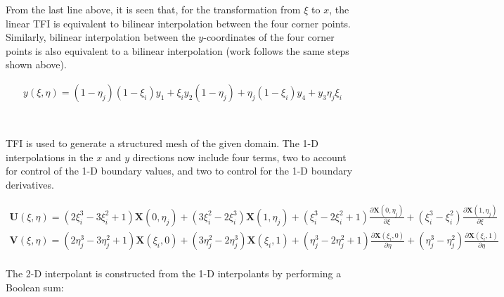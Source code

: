 \documentclass[10pt]{article}
\begin{document}
From the last line above, it is seen that, for the transformation from \(\xi\) to \(x\), the linear TFI is equivalent to bilinear interpolation between the four corner points. Similarly, bilinear interpolation between the \(y\)-coordinates of the four corner points is also equivalent to a bilinear interpolation (work follows the same steps shown above).

\begin{equation}
\begin{aligned}
y(\xi,\eta)= (1-\eta_j)(1-\xi_i)y_1+\xi_i y_2(1-\eta_j)+\eta_j(1-\xi_i)y_4+ y_3\eta_j\xi_i\\
\end{aligned}
\end{equation}

\section{}

TFI is used to generate a structured mesh of the given domain. The 1-D interpolations in the \(x\) and \(y\) directions now include four terms, two to account for control of the 1-D boundary values, and two to control for the 1-D boundary derivatives.

\begin{equation}
\begin{aligned}
\textbf{U}(\xi,\eta)=(2\xi_i^3-3\xi_i^2+1)\textbf{X}(0,\eta_j)+(3\xi_i^2-2\xi_i^3)\textbf{X}(1,\eta_j)+(\xi_i^3-2\xi_i^2+1)\frac{\partial\textbf{X}(0,\eta_j)}{\partial\xi}+(\xi_i^3-\xi_i^2)\frac{\partial\textbf{X}(1,\eta_j)}{\partial\xi}\\
\textbf{V}(\xi,\eta)=(2\eta_j^3-3\eta_j^2+1)\textbf{X}(\xi_i,0)+(3\eta_j^2-2\eta_j^3)\textbf{X}(\xi_i,1)+(\eta_j^3-2\eta_j^2+1)\frac{\partial\textbf{X}(\xi_i,0)}{\partial\eta}+(\eta_j^3-\eta_j^2)\frac{\partial\textbf{X}(\xi_i,1)}{\partial\eta}\\
\end{aligned}
\end{equation}

The 2-D interpolant is constructed from the 1-D interpolants by performing a Boolean sum:
\end{document}
